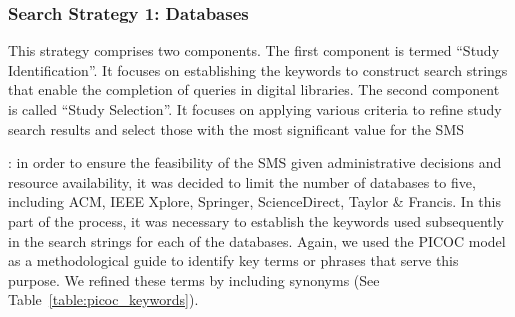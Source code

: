 
\newcommand{\acm}{518}
\newcommand{\ieee}{0}
\newcommand{\sd}{120}
\newcommand{\spr}{209}
\newcommand{\tf}{0}
\newcommand{\tot}{847}
\newcommand{\acmp}{\fpeval{round(\acm*100/\tot,2)}}
\newcommand{\ieeep}{\fpeval{round(\ieee*100/\tot,2)}}
\newcommand{\sdp}{\fpeval{round(\sd*100/\tot,2)}}
\newcommand{\sprp}{\fpeval{round(\spr*100/\tot,2)}}
\newcommand{\tfp}{\fpeval{round(\tf*100/\tot,2)}}


\newcommand{\iacm}{315}
\newcommand{\iieee}{0}
\newcommand{\isd}{101}
\newcommand{\ispr}{63}
\newcommand{\itf}{0}
\newcommand{\itot}{479}
\newcommand{\iacmp}{\fpeval{round(\iacm*100/\itot,2)}}
\newcommand{\iieeep}{\fpeval{round(\iieee*100/\itot,2)}}
\newcommand{\isdp}{\fpeval{round(\isd*100/\itot,2)}}
\newcommand{\isprp}{\fpeval{round(\ispr*100/\itot,2)}}
\newcommand{\itfp}{\fpeval{round(\itf*100/\itot,2)}}

\newcommand{\numEstEx}{3}

\newcommand{\depTot}{\fpeval{\itot-\numEstEx}}

\newcommand{\screen}{377}
\newcommand{\screenTot}{\fpeval{\depTot-\screen}}

\subsubsection{Search Strategy 1: Databases}

This strategy comprises two components. The first component is termed ``Study Identification''. It focuses on establishing the keywords to construct search strings that enable the completion of queries in digital libraries. The second component is called ``Study Selection''. It focuses on applying various criteria to refine study search results and select those with the most significant value for the SMS\@

: in order to ensure the feasibility of the SMS given administrative decisions and resource availability, it was decided to limit the number of databases to five, including ACM, IEEE Xplore, Springer, ScienceDirect, Taylor \& Francis. In this part of the process, it was necessary to establish the keywords used subsequently in the search strings for each of the databases. Again, we used the PICOC model as a methodological guide to identify key terms or phrases that serve this purpose. We refined these terms by including synonyms (See Table~\ref{table:picoc_keywords}).

